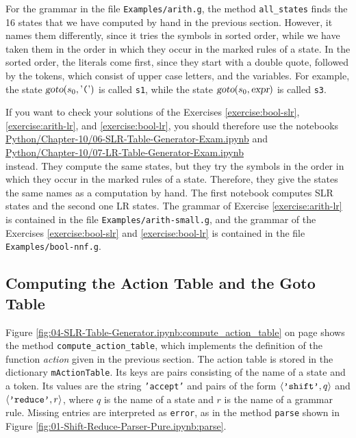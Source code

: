 For the grammar in the file \texttt{Examples/arith.g}, the method \texttt{all\_states} finds the 16 states that we
have computed by hand in the previous section.  However, it names them differently, since it tries the symbols in
sorted order, while we have taken them in the order in which they occur in the marked rules of a state.  In the
sorted order, the literals come first, since they start with a double quote, followed by the tokens, which consist
of upper case letters, and the variables.  For example, the state $\textsl{goto}(s_0, \mbox{'\texttt{(}'})$ is called
\texttt{s1}, while the state $\textsl{goto}(s_0, \textsl{expr})$ is called \texttt{s3}.

If you want to check your solutions of the Exercises \ref{exercise:bool-slr}, \ref{exercise:arith-lr}, and
\ref{exercise:bool-lr}, you should therefore use the notebooks
\\[0.2cm]
\hspace*{1.3cm}
\href{https://github.com/karlstroetmann/Formal-Languages/blob/master/Python/Chapter-10/06-SLR-Table-Generator-Exam.ipynb}{Python/Chapter-10/06-SLR-Table-Generator-Exam.ipynb}
\quad and
\\[0.1cm]
\hspace*{1.3cm}
\href{https://github.com/karlstroetmann/Formal-Languages/blob/master/Python/Chapter-10/07-LR-Table-Generator-Exam.ipynb}{Python/Chapter-10/07-LR-Table-Generator-Exam.ipynb}
\\[0.2cm]
instead.  They compute the same states, but they try the symbols in the order in which they occur in the marked
rules of a state.  Therefore, they give the states the same names as a computation by hand.  The first notebook
computes SLR states and the second one LR states.  The grammar of Exercise \ref{exercise:arith-lr} is contained in
the file \texttt{Examples/arith-small.g}, and the grammar of the Exercises \ref{exercise:bool-slr} and
\ref{exercise:bool-lr} is contained in the file \texttt{Examples/bool-nnf.g}.

\subsection{Computing the Action Table and the Goto Table}
Figure \ref{fig:04-SLR-Table-Generator.ipynb:compute_action_table} on page
\pageref{fig:04-SLR-Table-Generator.ipynb:compute_action_table} shows the method \texttt{compute\_action\_table},
which implements the definition of the function \textsl{action} given in the previous section.  The action table
is stored in the dictionary \texttt{mActionTable}.  Its keys are pairs consisting of the name of a state and a
token.  Its values are the string \texttt{'accept'} and pairs of the form $\pair(\texttt{'shift'}, q)$ and
$\pair(\texttt{'reduce'}, r)$, where $q$ is the name of a state and $r$ is the name of a grammar rule.  Missing
entries are interpreted as \texttt{error}, as in the method \texttt{parse} shown in Figure
\ref{fig:01-Shift-Reduce-Parser-Pure.ipynb:parse}.

